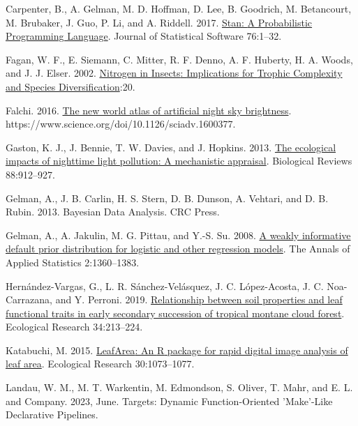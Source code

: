 \documentclass[
  12pt,
  letterpaper,
  DIV=11,
  numbers=noendperiod]{scrartcl}
\newlength{\cslhangindent}
\newlength{\cslentryspacingunit} %
\newenvironment{CSLReferences}[2] %
 {%
  \setlength{\parindent}{0pt}
  \ifodd #1
  \let\oldpar\par
  \def\par{\hangindent=\cslhangindent\oldpar}
  \fi
  \setlength{\parskip}{#2\cslentryspacingunit}
 }%
 {}
\begin{document}
\begin{CSLReferences}{1}{0}
\leavevmode{}%
Carpenter, B., A. Gelman, M. D. Hoffman, D. Lee, B. Goodrich, M.
Betancourt, M. Brubaker, J. Guo, P. Li, and A. Riddell. 2017.
\href{https://doi.org/10.18637/jss.v076.i01}{Stan: {A Probabilistic
Programming Language}}. Journal of Statistical Software 76:1--32.

\leavevmode{}%
Fagan, W. F., E. Siemann, C. Mitter, R. F. Denno, A. F. Huberty, H. A.
Woods, and J. J. Elser. 2002.
\href{https://doi.org/10.1086/343879}{Nitrogen in {Insects}:
{Implications} for {Trophic Complexity} and {Species
Diversification}}:20.

\leavevmode{}%
Falchi. 2016. \href{https://doi.org/10.1126/sciadv.1600377}{The new
world atlas of artificial night sky brightness}.
https://www.science.org/doi/10.1126/sciadv.1600377.

\leavevmode{}%
Gaston, K. J., J. Bennie, T. W. Davies, and J. Hopkins. 2013.
\href{https://doi.org/10.1111/brv.12036}{The ecological impacts of
nighttime light pollution: A mechanistic appraisal}. Biological Reviews
88:912--927.

\leavevmode{}%
Gelman, A., J. B. Carlin, H. S. Stern, D. B. Dunson, A. Vehtari, and D.
B. Rubin. 2013. Bayesian {Data Analysis}. {CRC Press}.

\leavevmode{}%
Gelman, A., A. Jakulin, M. G. Pittau, and Y.-S. Su. 2008.
\href{https://doi.org/10.1214/08-AOAS191}{A weakly informative default
prior distribution for logistic and other regression models}. The Annals
of Applied Statistics 2:1360--1383.

\leavevmode{}%
Hernández-Vargas, G., L. R. Sánchez-Velásquez, J. C. López-Acosta, J. C.
Noa-Carrazana, and Y. Perroni. 2019.
\href{https://doi.org/10.1111/1440-1703.1267}{Relationship between soil
properties and leaf functional traits in early secondary succession of
tropical montane cloud forest}. Ecological Research 34:213--224.

\leavevmode{}%
Katabuchi, M. 2015.
\href{https://doi.org/10.1007/s11284-015-1307-x}{{LeafArea}: An {R}
package for rapid digital image analysis of leaf area}. Ecological
Research 30:1073--1077.

\leavevmode{}%
Landau, W. M., M. T. Warkentin, M. Edmondson, S. Oliver, T. Mahr, and E.
L. and Company. 2023, June. Targets: {Dynamic Function-Oriented}
'{Make}'-{Like Declarative Pipelines}.


\end{CSLReferences}
\end{document}
